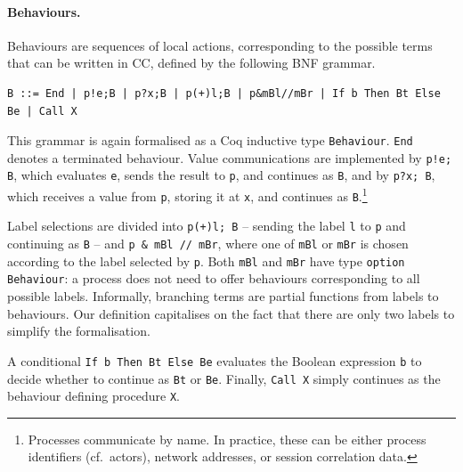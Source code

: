 \documentclass[runningheads]{llncs}
\begin{document}
\paragraph{Behaviours.}
Behaviours are sequences of local actions, corresponding to the possible terms that can be written in CC,
defined by the following BNF grammar.
\begin{lstlisting}
B ::= End | p!e;B | p?x;B | p(+)l;B | p&mBl//mBr | If b Then Bt Else Be | Call X
\end{lstlisting}
This grammar is again formalised as a Coq inductive type \lstinline+Behaviour+.
\lstinline+End+ denotes a terminated behaviour.
Value communications are implemented by \lstinline+p!e; B+, which evaluates \lstinline+e+, sends the result to \lstinline+p+, and continues as \lstinline+B+, and by \lstinline+p?x; B+, which receives a value from \lstinline+p+, storing it at \lstinline+x+, and continues as \lstinline+B+.\footnote{Processes
communicate by name. In practice, these can be either process identifiers (cf.\ actors), network addresses, or session correlation data.}

Label selections are divided into \lstinline!p(+)l; B! -- sending the label \lstinline+l+ to \lstinline+p+ and continuing as \lstinline+B+ -- and \lstinline+p & mBl // mBr+, where one of \lstinline+mBl+ or
\lstinline+mBr+ is chosen according to the label selected by \lstinline+p+.
Both \lstinline+mBl+ and \lstinline+mBr+ have type \lstinline+option Behaviour+: a process does not need to offer behaviours corresponding to all possible labels.
Informally, branching terms are partial functions from labels to behaviours.
Our definition capitalises on the fact that there are only two labels to simplify the formalisation.

A conditional \lstinline+If b Then Bt Else Be+ evaluates the Boolean expression \lstinline+b+ to decide whether to continue as \lstinline+Bt+ or \lstinline+Be+.
Finally, \lstinline+Call X+ simply continues as the behaviour defining procedure \lstinline+X+.
\end{document}
